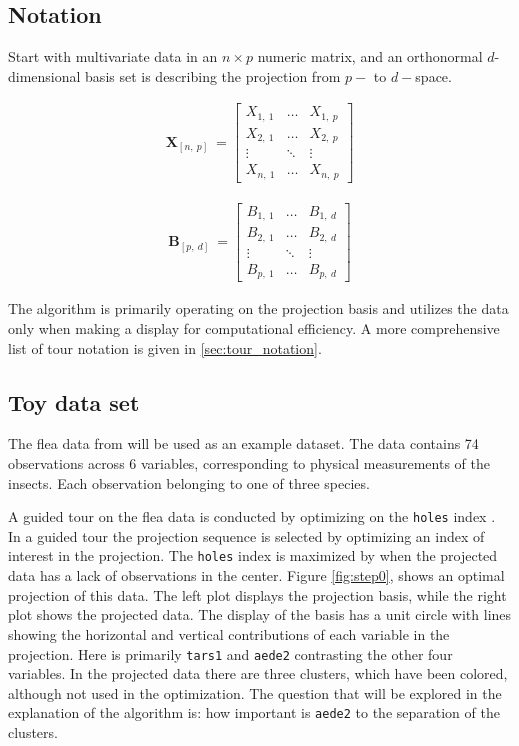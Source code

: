 \documentclass{monashthesis}
\begin{document}
\subsection{Notation}\label{notation}

Start with multivariate data in an \(n \times p\) numeric matrix, and an
orthonormal \(d\)-dimensional basis set is describing the projection
from \(p-\) to \(d-\)space.

\begin{align*}
  \textbf{X}_{[n,~p]} ~=
  \begin{bmatrix}
    X_{1,~1} & \dots  & X_{1,~p} \\
    X_{2,~1} & \dots  & X_{2,~p} \\
    \vdots   & \ddots & \vdots   \\
    X_{n,~1} & \dots  & X_{n,~p}
  \end{bmatrix}
\end{align*}

\begin{align*}
  \textbf{B}_{[p,~d]} ~=
  \begin{bmatrix}
    B_{1,~1} & \dots  & B_{1,~d} \\
    B_{2,~1} & \dots  & B_{2,~d} \\
    \vdots   & \ddots & \vdots   \\
    B_{p,~1} & \dots  & B_{p,~d}
  \end{bmatrix}
\end{align*}

The algorithm is primarily operating on the projection basis and
utilizes the data only when making a display for computational
efficiency. A more comprehensive list of tour notation is given in
\ref{sec:tour_notation}.

\subsection{Toy data set}\label{toy-data-set}

The flea data from \textcite{lubischew_use_1962} will be used as an
example dataset. The data contains 74 observations across 6 variables,
corresponding to physical measurements of the insects. Each observation
belonging to one of three species.

A guided tour on the flea data is conducted by optimizing on the
\texttt{holes} index \autocite{cook_interactive_2007}. In a guided tour
the projection sequence is selected by optimizing an index of interest
in the projection. The \texttt{holes} index is maximized by when the
projected data has a lack of observations in the center. Figure
\ref{fig:step0}, shows an optimal projection of this data. The left plot
displays the projection basis, while the right plot shows the projected
data. The display of the basis has a unit circle with lines showing the
horizontal and vertical contributions of each variable in the
projection. Here is primarily \texttt{tars1} and \texttt{aede2}
contrasting the other four variables. In the projected data there are
three clusters, which have been colored, although not used in the
optimization. The question that will be explored in the explanation of
the algorithm is: how important is \texttt{aede2} to the separation of
the clusters.
\end{document}
